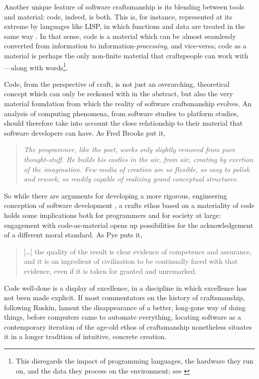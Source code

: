 Another unique feature of software craftsmanship is its blending between tools and material: code, indeed, is both. This is, for instance, represented at its extreme by languages like LISP, in which functions and data are treated in the same way \citep{mccarthy_lisp_1965}. In that sense, code is a material which can be almost seamlessly converted from information to information-\emph{processing}, and vice-versa; code as a material is perhaps the only non-finite material that craftspeople can work with—along with words\footnote{This disregards the impact of programming languages, the hardware they run on, and the data they process on the environment; see \citep{kurp_green_2008}}.

Code, from the perspective of craft, is not just an overarching, theoretical concept which can only be reckoned with in the abstract, but also the very material foundation from which the reality of software craftsmanship evolves. An analysis of computing phenomena, from software studies to platform studies, should therefore take into account the close relationship to their material that software developers can have. As Fred Brooks put it,

\begin{quote}
    \emph{The programmer, like the poet, works only slightly removed from pure thought-stuff. He builds his castles in the air, from air, creating by exertion of the imagination. Few media of creation are so flexible, so easy to polish and rework, so readily capable of realizing grand conceptual structures. \citep{brooks_mythical_1975}}
\end{quote}

So while there are arguments for developing a more rigorous, engineering conception of software development \citep{ensmenger_computer_2012}, a crafts ethos based on a materiality of code holds some implications both for programmers and for society at large: engagement with code-as-material opens up possibilities for the acknowledgement of a different moral standard. As Pye puts it,

\begin{quote}
    [\dots] the quality of the result is clear evidence of competence and assurance, and it is an ingredient of civilization to be continually faced with that evidence, even if it is taken for granted and unremarked. \citep{pye_nature_2008}
\end{quote}

Code well-done is a display of excellence, in a discipline in which excellence has not been made explicit. If most commentators on the history of craftsmanship, following Ruskin, lament the disappearance of a better, long-gone way of doing things, before computers came to automate everything, locating software as a contemporary iteration of the age-old ethos of craftsmanship nonetheless situates it in a longer tradition of intuitive, concrete creation.

